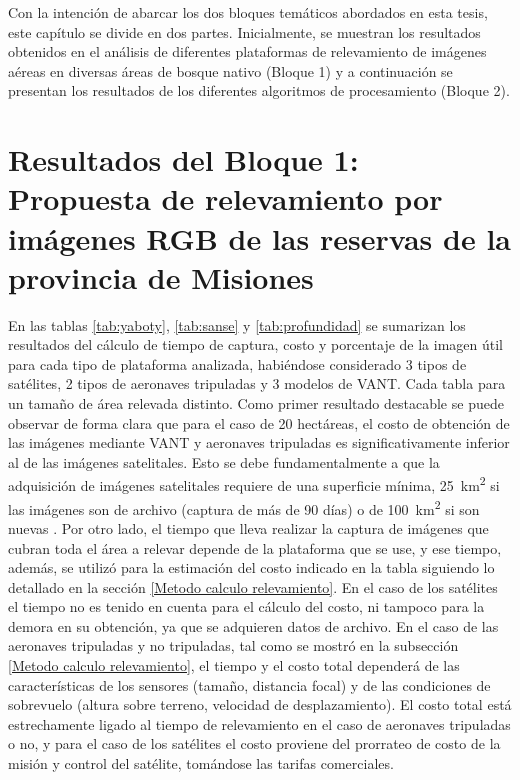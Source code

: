 

Con la intención de abarcar los dos bloques temáticos abordados en esta tesis, este capítulo se divide en dos partes. Inicialmente, se muestran los resultados obtenidos en el análisis de diferentes plataformas de relevamiento de imágenes aéreas en diversas áreas de bosque nativo (Bloque 1) y a continuación se presentan los resultados de los diferentes algoritmos de procesamiento (Bloque 2).
\section {Resultados del Bloque 1: Propuesta de relevamiento por imágenes RGB de las reservas de la provincia de Misiones} \label{resultados bloque 1}
En las tablas \ref{tab:yaboty}, \ref{tab:sanse} y \ref{tab:profundidad} se sumarizan los resultados del cálculo de tiempo de captura, costo y porcentaje de la imagen útil para cada tipo de plataforma analizada, habiéndose considerado 3 tipos de satélites, 2 tipos de aeronaves tripuladas y 3 modelos de VANT. Cada tabla para un tamaño de área relevada distinto. Como primer resultado destacable se puede observar de forma clara que para el caso de 20 hectáreas, el costo de obtención de las imágenes mediante VANT y aeronaves tripuladas es significativamente inferior al de las imágenes satelitales. Esto se debe fundamentalmente a que la adquisición de imágenes satelitales requiere de una superficie mínima, \SI{25}{\kilo\metre\squared} si las imágenes son de archivo (captura de más de 90 días) o de \SI{100}{\kilo\metre\squared} si son nuevas \cite{noauthor_satellite_2020}.
Por otro lado, el tiempo que lleva realizar la captura de imágenes que cubran toda el área a relevar depende de la plataforma que se use, y ese tiempo, además, se utilizó para la estimación del costo indicado en la tabla siguiendo lo detallado en la sección \ref{Metodo calculo relevamiento}. 
En el caso de los satélites el tiempo no es tenido en cuenta para el cálculo del costo, ni tampoco para la demora en su obtención, ya que se adquieren datos de archivo. En el caso de las aeronaves tripuladas y no tripuladas, tal como se mostró en la subsección \ref{Metodo calculo relevamiento}, el tiempo y el costo total dependerá de las características de los sensores (tamaño, distancia focal) y de las condiciones de sobrevuelo (altura sobre terreno, velocidad de desplazamiento). El costo total está estrechamente ligado al tiempo de relevamiento en el caso de aeronaves tripuladas o no, y para el caso de los satélites el costo proviene del prorrateo de costo de la misión y control del satélite, tomándose las tarifas comerciales.
